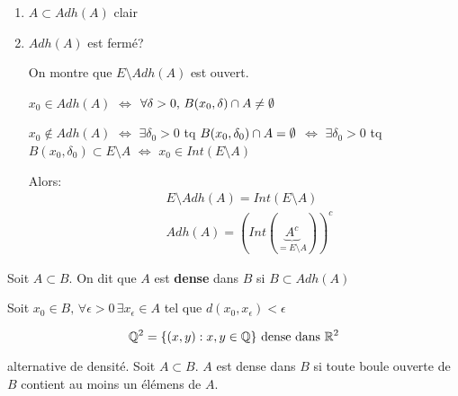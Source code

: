 \begin{preuve}
   \begin{enumerate}
       \item $A \subset Adh(A)$ clair
       \item $Adh(A)$ est fermé?
           \par On montre que  $E \setminus Adh(A)$ est ouvert. \par 
           $x_0 \in Adh(A)$ $\iff$ $\forall \delta > 0, \, B(x_0, \delta) \cap A \neq \emptyset$ \par
           $x_0 \not\in Adh(A)$ $\iff$ $\exists \delta_0 > 0$ tq $B(x_0, \delta_0) \cap A = \emptyset$ $\iff$ $\exists \delta_0>0$ tq $B(x_0, \delta_0) \subset E\setminus A$ $\iff$ $x_0 \in Int(E\setminus A)$ 
           \par Alors:
           \begin{align*}
               &E \setminus Adh(A) = Int(E \setminus A)\\
               &Adh(A) = (Int(\underbrace{A^{c}}_{= E \setminus A}))^{c}
           \end{align*}
   \end{enumerate} 
\end{preuve}
\begin{definition}
    Soit $A \subset B$. On dit que $A$ est \textbf{dense} dans  $B$ si  $B \subset Adh(A)$
    \par
    Soit $x_0 \in B, \, \forall \epsilon > 0 \, \exists  x_{\epsilon} \in A$ tel que $d(x_0, x_{\epsilon}) < \epsilon$
\end{definition}
\begin{eg}
   \[
       \mathbb{Q}^2 = \{(x, y): x,y \in \mathbb{Q}\} \text{ dense dans } \mathbb{R}^2
   \]  
   
\end{eg}
\begin{definition}
    alternative de densité. Soit $A \subset B$. $A$ est dense dans  $B$ si toute boule ouverte de  $B$ contient au moins un élémens de  $A$.
\end{definition}

